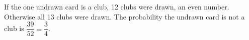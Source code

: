 If the one undrawn card is a club, 12 clubs were drawn, an even number. Otherwise all 13 clubs were drawn. The probability the undrawn card is not a club is $\dfrac{39}{52}=\boxed{\dfrac{3}{4}}$.

